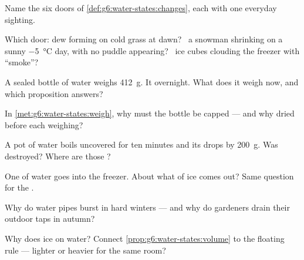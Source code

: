 \begin{exercise}[$\star$]\label{exo:g6:water-states:1}
Name the six doors of \cref{def:g6:water-states:changes}, each
with one everyday sighting.
\end{exercise}

\begin{exercise}[$\star$]\label{exo:g6:water-states:2}
Which door: dew forming on cold grass at dawn? \ a snowman
shrinking on a sunny \qty{-5}{\celsius} day, with no puddle
appearing? \ ice cubes clouding the freezer with ``smoke''?
\end{exercise}

\begin{exercise}[$\star$]\label{exo:g6:water-states:3}
A sealed bottle of water weighs \qty{412}{g}. It  
overnight. What does it weigh now, and which proposition answers?
\end{exercise}

\begin{exercise}[$\star$]\label{exo:g6:water-states:4}
In \cref{met:g6:water-states:weigh}, why must the bottle be capped
--- and why dried before each weighing?
\end{exercise}

\begin{exercise}[$\star$]\label{exo:g6:water-states:5}
A pot of water boils uncovered for ten minutes and its  drops
by \qty{200}{g}. Was  destroyed? Where are those ?
\end{exercise}

\begin{exercise}[$\star$]\label{exo:g6:water-states:6}
One  of water goes into the freezer. About what  of ice
comes out? Same question for the .
\end{exercise}

\begin{exercise}[$\star$]\label{exo:g6:water-states:7}
Why do water pipes burst in hard winters --- and why do gardeners
drain their outdoor taps in autumn?
\end{exercise}

\begin{exercise}[$\star$]\label{exo:g6:water-states:8}
Why does ice  on water? Connect
\cref{prop:g6:water-states:volume} to the floating rule ---
lighter or heavier for the same room?
\end{exercise}

